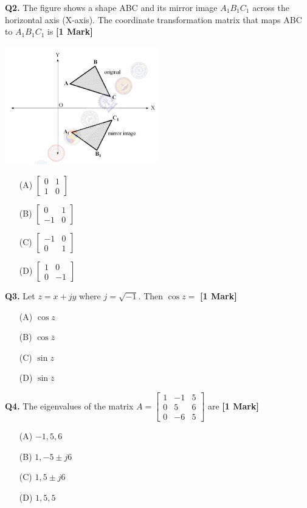 \documentclass[11pt]{article}
\newcommand{\questiona}[2]{
    \noindent\textbf{Q#2.} #1 \hfill \textbf{[1 Mark]}
}
\begin{document}
\questiona{The figure shows a shape ABC and its mirror image \( A_1B_1C_1 \) across the horizontal axis (X-axis). The coordinate transformation matrix that maps ABC to \( A_1B_1C_1 \) is}{2}
\begin{center}
\includegraphics[width=0.5\textwidth]{figures/2.png}
\end{center}
\begin{enumerate}
    \item[(A)] \(\begin{bmatrix} 0 & 1 \\ 1 & 0 \end{bmatrix}\)
    \item[(B)] \(\begin{bmatrix} 0 & 1 \\ -1 & 0 \end{bmatrix}\)
    \item[(C)] \(\begin{bmatrix} -1 & 0 \\ 0 & 1 \end{bmatrix}\)
    \item[(D)] \(\begin{bmatrix} 1 & 0 \\ 0 & -1 \end{bmatrix}\)
\end{enumerate}
\vspace{0.5cm}

\questiona{Let \( z = x + jy \) where \( j = \sqrt{-1} \). Then \(\cos z =\)}{3}
\begin{enumerate}
    \item[(A)] \(\cos z\)  
    \item[(B)] \(\cos \overline{z}\)  
    \item[(C)] \(\sin z\)  
    \item[(D)] \(\sin \overline{z}\)
\end{enumerate}
\vspace{0.5cm}

\questiona{The eigenvalues of the matrix \( A = \begin{bmatrix} 1 & -1 & 5 \\ 0 & 5 & 6 \\ 0 & -6 & 5 \end{bmatrix} \) are}{4}
\begin{enumerate}
    \item[(A)] \(-1, 5, 6\)  
    \item[(B)] \(1, -5 \pm j6\)  
    \item[(C)] \(1, 5 \pm j6\)  
    \item[(D)] \(1, 5, 5\)
\end{enumerate}
\vspace{0.5cm}
\end{document}
